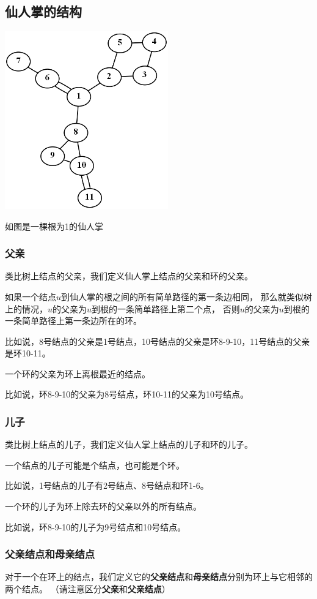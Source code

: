 \documentclass{noithesis}
\begin{document}
\subsection{仙人掌的结构}

\includegraphics[width=200pt,height=217.3pt]{images/cactus-example.png}

如图是一棵根为1的仙人掌

\subsubsection{父亲}
类比树上结点的父亲，我们定义仙人掌上结点的父亲和环的父亲。

如果一个结点$u$到仙人掌的根之间的所有简单路径的第一条边相同，
那么就类似树上的情况，$u$的父亲为$u$到根的一条简单路径上第二个点，
否则$u$的父亲为$u$到根的一条简单路径上第一条边所在的环。

比如说，8号结点的父亲是1号结点，10号结点的父亲是环8-9-10，11号结点的父亲是环10-11。

一个环的父亲为环上离根最近的结点。

比如说，环8-9-10的父亲为8号结点，环10-11的父亲为10号结点。


\subsubsection{儿子}
类比树上结点的儿子，我们定义仙人掌上结点的儿子和环的儿子。

一个结点的儿子可能是个结点，也可能是个环。

比如说，1号结点的儿子有2号结点、8号结点和环1-6。

一个环的儿子为环上除去环的父亲以外的所有结点。

比如说，环8-9-10的儿子为9号结点和10号结点。


\subsubsection{父亲结点和母亲结点}
对于一个在环上的结点，我们定义它的\textbf{父亲结点}和\textbf{母亲结点}分别为环上与它相邻的两个结点。
（请注意区分\textbf{父亲}和\textbf{父亲结点}）
\end{document}
